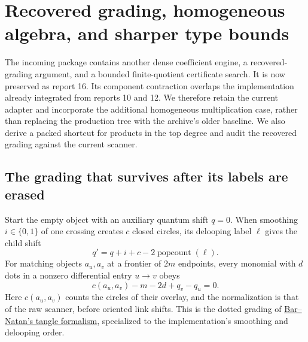 \section{Recovered grading, homogeneous algebra, and sharper type bounds}
\label{sec:homogeneous-integration}

The incoming package 
contains another dense coefficient engine, a recovered-grading argument,
and a bounded finite-quotient certificate search. It is now preserved as
report 16. Its component contraction
overlaps the implementation already integrated from reports 10 and 12.
We therefore retain the current adapter and incorporate the additional
homogeneous multiplication case, rather than replacing the production
tree with the archive's older baseline. We also derive a packed shortcut
for products in the top degree and audit the recovered grading against
the current scanner.

\subsection{The grading that survives after its labels are erased}
Start the empty object with an auxiliary quantum shift $q=0$.
When smoothing $i\in\{0,1\}$ of one crossing creates $c$ closed
circles, its delooping label $\ell$ gives the child shift
\[
 q'=q+i+c-2\operatorname{popcount}(\ell).
\]
For matching objects $a_u,a_v$ at a frontier of $2m$ endpoints, every
monomial with $d$ dots in a nonzero differential entry $u\to v$ obeys
\begin{equation}\label{eq:recovered-grading}
 c(a_u,a_v)-m-2d+q_v-q_u=0.
\end{equation}
Here $c(a_u,a_v)$ counts the circles of their overlay, and the
normalization is that of the raw scanner, before oriented link shifts.
This is the dotted grading of
\href{https://arxiv.org/abs/math/0410495v2}{Bar--Natan's tangle formalism},
specialized to the implementation's smoothing and delooping order.


